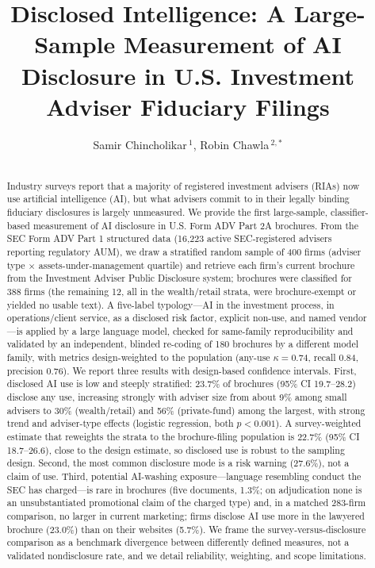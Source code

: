 \documentclass[utf8]{FrontiersinHarvard}
\def\firstAuthorLast{Chincholikar {and} Chawla}
\def\Authors{Samir Chincholikar\,$^{1}$, Robin Chawla\,$^{2,*}$}
\begin{document}
\onecolumn
{}

\title[Disclosed Intelligence]{Disclosed Intelligence: A Large-Sample Measurement of AI Disclosure in U.S. Investment Adviser Fiduciary Filings}

\author[\firstAuthorLast ]{\Authors}
\address{}
\correspondance{}
\extraAuth{}

\maketitle

\begin{abstract}
\section{}
Industry surveys report that a majority of registered investment advisers (RIAs) now use artificial intelligence (AI), but what advisers commit to in their legally binding fiduciary disclosures is largely unmeasured. We provide the first large-sample, classifier-based measurement of AI disclosure in U.S. Form ADV Part 2A brochures. From the SEC Form ADV Part 1 structured data (16{,}223 active SEC-registered advisers reporting regulatory AUM), we draw a stratified random sample of 400 firms (adviser type $\times$ assets-under-management quartile) and retrieve each firm's current brochure from the Investment Adviser Public Disclosure system; brochures were classified for 388 firms (the remaining 12, all in the wealth/retail strata, were brochure-exempt or yielded no usable text). A five-label typology---AI in the investment process, in operations/client service, as a disclosed risk factor, explicit non-use, and named vendor---is applied by a large language model, checked for same-family reproducibility and validated by an independent, blinded re-coding of 180 brochures by a different model family, with metrics design-weighted to the population (any-use $\kappa = 0.74$, recall 0.84, precision 0.76). We report three results with design-based confidence intervals. First, disclosed AI use is low and steeply stratified: 23.7\% of brochures (95\% CI 19.7--28.2) disclose any use, increasing strongly with adviser size from about 9\% among small advisers to 30\% (wealth/retail) and 56\% (private-fund) among the largest, with strong trend and adviser-type effects (logistic regression, both $p < 0.001$). A survey-weighted estimate that reweights the strata to the brochure-filing population is 22.7\% (95\% CI 18.7--26.6), close to the design estimate, so disclosed use is robust to the sampling design. Second, the most common disclosure mode is a risk warning (27.6\%), not a claim of use. Third, potential AI-washing exposure---language resembling conduct the SEC has charged---is rare in brochures (five documents, 1.3\%; on adjudication none is an unsubstantiated promotional claim of the charged type) and, in a matched 283-firm comparison, no larger in current marketing; firms disclose AI use more in the lawyered brochure (23.0\%) than on their websites (5.7\%). We frame the survey-versus-disclosure comparison as a benchmark divergence between differently defined measures, not a validated nondisclosure rate, and we detail reliability, weighting, and scope limitations.


\end{abstract}
\end{document}
